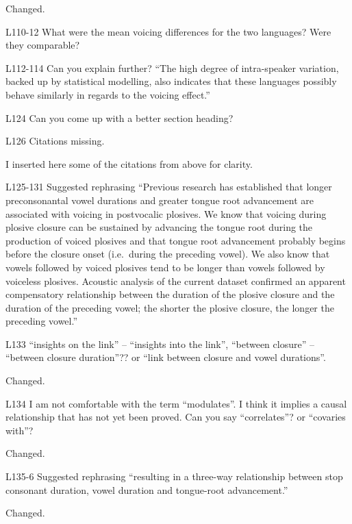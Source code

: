 \documentclass[]{article}
\begin{document}
\color{plum}

Changed. \color{black}

L110-12 What were the mean voicing differences for the two languages?
Were they comparable?

L112-114 Can you explain further? ``The high degree of intra-speaker
variation, backed up by statistical modelling, also indicates that these
languages possibly behave similarly in regards to the voicing effect.''

L124 Can you come up with a better section heading?

L126 Citations missing.

\color{plum}

I inserted here some of the citations from above for clarity.
\color{black}

L125-131 Suggested rephrasing ``Previous research has established that
longer preconsonantal vowel durations and greater tongue root
advancement are associated with voicing in postvocalic plosives. We know
that voicing during plosive closure can be sustained by advancing the
tongue root during the production of voiced plosives and that tongue
root advancement probably begins before the closure onset (i.e.~during
the preceding vowel). We also know that vowels followed by voiced
plosives tend to be longer than vowels followed by voiceless plosives.
Acoustic analysis of the current dataset confirmed an apparent
compensatory relationship between the duration of the plosive closure
and the duration of the preceding vowel; the shorter the plosive
closure, the longer the preceding vowel.''

L133 ``insights on the link'' -- ``insights into the link'', ``between
closure'' -- ``between closure duration''?? or ``link between closure
and vowel durations''.

\color{plum}

Changed. \color{black}

L134 I am not comfortable with the term ``modulates''. I think it
implies a causal relationship that has not yet been proved. Can you say
``correlates''? or ``covaries with''?

\color{plum}

Changed. \color{black}

L135-6 Suggested rephrasing ``resulting in a three-way relationship
between stop consonant duration, vowel duration and tongue-root
advancement.''

\color{plum}

Changed. \color{black}
\end{document}
